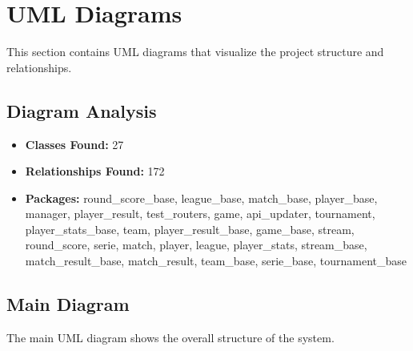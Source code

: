 \documentclass[11pt,a4paper]{article}
\begin{document}
\vspace{1em}

\section{UML Diagrams}

This section contains UML diagrams that visualize the project structure and relationships.

\subsection{Diagram Analysis}

\begin{itemize}
    \item \textbf{Classes Found:} 27
    \item \textbf{Relationships Found:} 172
    \item \textbf{Packages:} round\_score\_base, league\_base, match\_base, player\_base, manager, player\_result, test\_routers, game, api\_updater, tournament, player\_stats\_base, team, player\_result\_base, game\_base, stream, round\_score, serie, match, player, league, player\_stats, stream\_base, match\_result\_base, match\_result, team\_base, serie\_base, tournament\_base
\end{itemize}

\subsection{Main Diagram}

The main UML diagram shows the overall structure of the system.
\end{document}

